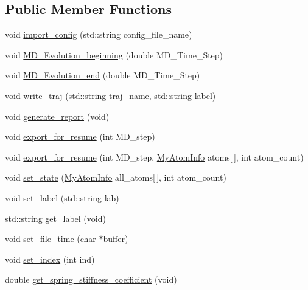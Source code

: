\subsection*{Public Member Functions}
\begin{DoxyCompactItemize}
\item 
void \mbox{\hyperlink{classECM_ad0f4b70c1e02703565ae0fc6428eaf22}{import\+\_\+config}} (std\+::string config\+\_\+file\+\_\+name)
\item 
void \mbox{\hyperlink{classECM_ace592138fc9af4c5c4717c682924fdbe}{M\+D\+\_\+\+Evolution\+\_\+beginning}} (double M\+D\+\_\+\+Time\+\_\+\+Step)
\item 
void \mbox{\hyperlink{classECM_a797a29a087e5aefdb2f14352259df371}{M\+D\+\_\+\+Evolution\+\_\+end}} (double M\+D\+\_\+\+Time\+\_\+\+Step)
\item 
void \mbox{\hyperlink{classECM_acf7ff0e1b7a7631eff70c8584d01c050}{write\+\_\+traj}} (std\+::string traj\+\_\+name, std\+::string label)
\item 
void \mbox{\hyperlink{classECM_ab6d157d62196d68af2437ffb3edc19fe}{generate\+\_\+report}} (void)
\item 
void \mbox{\hyperlink{classECM_ae6164ca0ddd7fa532b2a64fd763d34ff}{export\+\_\+for\+\_\+resume}} (int M\+D\+\_\+step)
\item 
void \mbox{\hyperlink{classECM_a1f9ee2b79c7cf98efe72a4e74ff7916f}{export\+\_\+for\+\_\+resume}} (int M\+D\+\_\+step, \mbox{\hyperlink{structMyAtomInfo}{My\+Atom\+Info}} atoms\mbox{[}$\,$\mbox{]}, int atom\+\_\+count)
\item 
void \mbox{\hyperlink{classECM_aa668c3991fcee9ac12c78383f0c0b0aa}{set\+\_\+state}} (\mbox{\hyperlink{structMyAtomInfo}{My\+Atom\+Info}} all\+\_\+atoms\mbox{[}$\,$\mbox{]}, int atom\+\_\+count)
\item 
void \mbox{\hyperlink{classECM_aa2f9122b1b849ab31856464889d328f4}{set\+\_\+label}} (std\+::string lab)
\item 
std\+::string \mbox{\hyperlink{classECM_a2979fbe785c15c43932ba9f6590fd4ef}{get\+\_\+label}} (void)
\item 
void \mbox{\hyperlink{classECM_ae637a880979bf8ea181b09b41a575fd1}{set\+\_\+file\+\_\+time}} (char $\ast$buffer)
\item 
void \mbox{\hyperlink{classECM_a78e54e27714f2ed310b75296eaba5495}{set\+\_\+index}} (int ind)
\item 
double \mbox{\hyperlink{classECM_ad3602738d7ce353dea8dc7c957080815}{get\+\_\+spring\+\_\+stiffness\+\_\+coefficient}} (void)
\item 

\end{DoxyCompactItemize}
